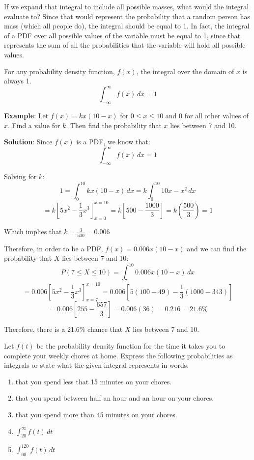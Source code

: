 If we expand that integral to include all possible masses, what would the 
integral evaluate to? Since that would represent the probability that a random 
person has mass (which all people do), the integral should be equal to 1. In 
fact, the integral of a PDF over all possible values of the variable must be 
equal to 1, since that represents the sum of all the probabilities that the 
variable will hold all possible values. 

\begin{mdframed}[style = important]
For any probability density function, $f(x)$, the integral over the domain of 
$x$ is always 1.
$$\int_{-\infty}^{\infty} f(x)\,dx = 1$$
\end{mdframed} 

\textbf{Example}: Let $f(x) = kx(10-x)$ for $0 \leq x \leq 10$ and $0$ for all 
other values of $x$. Find a value for $k$. Then find the probability that $x$ 
lies between 7 and 10. 

\textbf{Solution}: Since $f(x)$ is a PDF, we know that:
$$\int_{-\infty}^{\infty} f(x)\,dx = 1$$

Solving for $k$:
$$1 = \int_{0}^{10} kx(10-x)\,dx = k\int_0^{10} 10x - x^2\,dx$$
$$= k \left[5x^2 - \frac{1}{3}x^3 \right]_{x = 0}^{x = 10} = k\left[500 - 
\frac{1000}{3} \right] = k \left( \frac{500}{3} \right) = 1$$

Which implies that $k = \frac{3}{500} = 0.006$

Therefore, in order to be a PDF, $f(x) = 0.006x(10-x)$ and we can find the 
probability that $X$ lies between 7 and 10:
$$P(7 \leq X \leq 10) = \int_7^{10} 0.006x(10 - x)\,dx$$
$$= 0.006 \left[5x^2 - \frac{1}{3}x^3 \right]_{x = 7}^{x = 10} = 0.006 \left[ 
5 \left(100 - 49 \right) - \frac{1}{3} \left(1000 - 343 \right) \right]$$
$$= 0.006 \left[ 255 - \frac{657}{3} \right] = 0.006(36) = 0.216 = 21.6\%$$

Therefore, there is a 21.6\% chance that $X$ lies between 7 and 10. 

\begin{Exercise}[title = {Representing Probabilities as Integrals}, 
label = rep_int]
Let $f(t)$ be the probability density function for the time it takes you to 
complete your weekly chores at home. Express the following probabilities as 
integrals or state what the given integral represents in words. 
\begin{enumerate}
\item that you spend less that 15 minutes on your chores.
\item that you spend between half an hour and an hour on your chores.
\item that you spend more than 45 minutes on your chores. 
\item $\int_{20}^{\infty} f(t)\,dt$
\item $\int_{60}^{120} f(t)\,dt$
\end{enumerate}
\end{Exercise}

